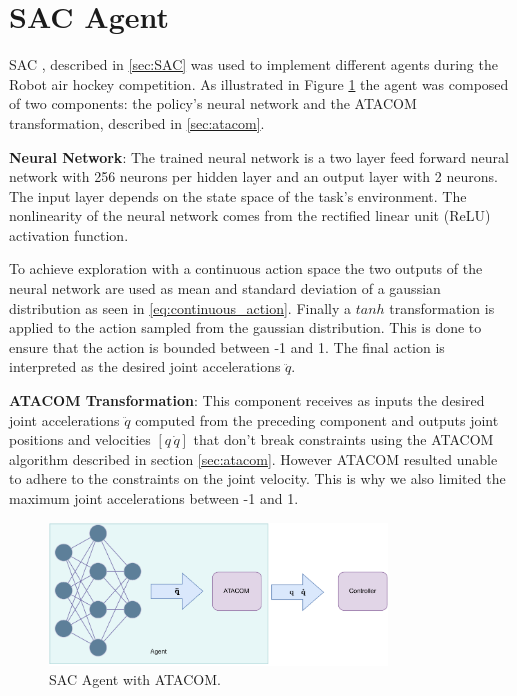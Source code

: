 \section{SAC Agent}
\label{sec:sac_agent}

SAC \cite{SAC}, described in \ref{sec:SAC} was used to implement different agents during the Robot air hockey competition.
As illustrated in Figure \ref{fig:sac_agent} the agent was composed of two components: the policy's neural network and the ATACOM transformation, described in \ref{sec:atacom}.

\textbf{Neural Network}:
The trained neural network is a two layer feed forward neural network with 256 neurons per hidden layer and an output layer with 2 neurons. 
The input layer depends on the state space of the task's environment. The nonlinearity of the neural network comes from the
rectified linear unit (ReLU) activation function.

To achieve exploration with a continuous action space the two outputs of the neural network are used as mean and standard deviation of a gaussian distribution as seen in \eqref{eq:continuous_action}.
Finally a $tanh$ transformation is applied to the action sampled from the gaussian distribution. This is done to ensure that the action is bounded between -1 and 1.
The final action is interpreted as the desired joint accelerations $\ddot{q}$.

\textbf{ATACOM Transformation}:
This component receives as inputs the desired joint accelerations $\ddot{q}$ computed from the preceding component and outputs joint positions and velocities $[q\,\dot{q}]$ 
that don't break constraints using the ATACOM algorithm \cite{ATACOM} described in section \ref{sec:atacom}. However ATACOM resulted unable to adhere to the constraints on the joint velocity.
This is why we also limited the maximum joint accelerations between -1 and 1.

\begin{figure}[H]
    \centering
    \includegraphics[width=0.8\textwidth]{Images/nn_atacom.pdf}
    \caption{SAC Agent with ATACOM.}
    \label{fig:sac_agent}
\end{figure}

